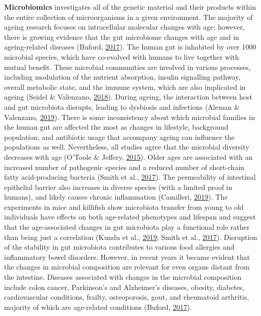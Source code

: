 \documentclass[12pt,twoside]{unicam}
\begin{document}
\textbf{Microbiomics} investigates all of the genetic material and their products within the entire collection of microorganisms in a given environment. The majority of ageing research focuses on intracellular molecular changes with age; however, there is growing evidence that the gut microbiome changes with age and in ageing-related diseases (Buford, \protect\hyperlink{ref-Buford2017}{2017}). The human gut is inhabited by over 1000 microbial species, which have co-evolved with humans to live together with mutual benefit. These microbial communities are involved in various processes, including modulation of the nutrient absorption, insulin signalling pathway, overall metabolic state, and the immune system, which are also implicated in ageing (Seidel \& Valenzano, \protect\hyperlink{ref-Seidel2018}{2018}). During ageing, the interaction between host and gut microbiota disrupts, leading to dysbiosis and infections (Aleman \& Valenzano, \protect\hyperlink{ref-Aleman2019}{2019}). There is some inconsistency about which microbial families in the human gut are affected the most as changes in lifestyle, background population, and antibiotic usage that accompany ageing can influence the populations as well. Nevertheless, all studies agree that the microbial diversity decreases with age (O'Toole \& Jeffery, \protect\hyperlink{ref-OToole2015}{2015}). Older ages are associated with an increased number of pathogenic species and a reduced number of short-chain fatty acid-producing bacteria (Smith et al., \protect\hyperlink{ref-Smith2017}{2017}). The permeability of intestinal epithelial barrier also increases in diverse species (with a limited proof in humans), and likely causes chronic inflammation (Camilleri, \protect\hyperlink{ref-Camilleri2019}{2019}). The experiments in mice and killifish show microbiota transfer from young to old individuals have effects on both age-related phenotypes and lifespan and suggest that the age-associated changes in gut microbiota play a functional role rather than being just a correlation (Kundu et al., \protect\hyperlink{ref-Kundu2019}{2019}; Smith et al., \protect\hyperlink{ref-Smith2017}{2017}). Disruption of the stability in gut microbiota contributes to various food allergies and inflammatory bowel disorders. However, in recent years it became evident that the changes in microbial composition are relevant for even organs distant from the intestine. Diseases associated with changes in the microbial composition include colon cancer, Parkinson's and Alzheimer's diseases, obesity, diabetes, cardiovascular conditions, frailty, osteoporosis, gout, and rheumatoid arthritis, majority of which are age-related conditions (Buford, \protect\hyperlink{ref-Buford2017}{2017}).
\end{document}
